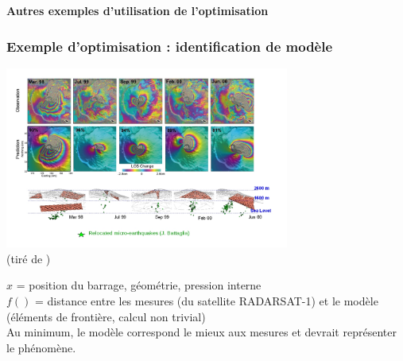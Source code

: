 \documentclass[12pt]{beamer}
\begin{document}
\begin{frame}
\begin{center}
{ 
\textbf{
Autres exemples d'utilisation de l'optimisation
} %
}%
\end{center}
\end{frame}


\begin{frame}
\frametitle{Exemple d'optimisation : identification de modèle}
\begin{center}
\includegraphics[width=0.7\textwidth]{piton_fournaise.jpg}\\
\vspace{-1cm}
{\hfill\tiny (tiré de \cite{fukushima2010evolution})}
\end{center}
$x$ = position du barrage, géométrie, pression interne\\
$f()$ = distance entre les mesures (du satellite RADARSAT-1) et le modèle (éléments de frontière, calcul non trivial)\\
Au minimum, le modèle correspond le mieux aux mesures et devrait représenter le phénomène.
\end{frame}
\end{document}
